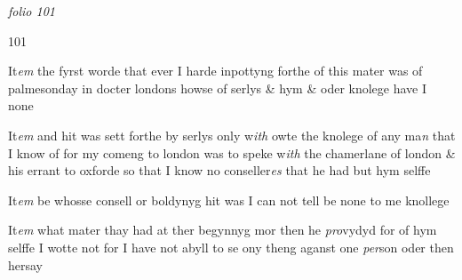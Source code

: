 \documentclass[12pt, a4paper]{book}
\begin{document}
\textit{folio 101}



\begin{flushright}{\color{Mahogany}101}\end{flushright}

            		
            			
				\marginpar[\vspace{0.5cm}{\textcolor{Gray}{1.}}]{}
			
            			
		\ifthenelse{\isodd{\thepage}}
		{\reversemarginpar}
		{\normalmarginpar}
		 It\textit{em} the fyrst worde that ever I harde inpottyng forthe of
 	this mater was of palmesonday in docter londons howse of
 serlys \& hym \& oder knolege have I none
            		
				\marginpar[\vspace{0.5cm}{\textcolor{Gray}{2.}}]{}
			
		\ifthenelse{\isodd{\thepage}}
		{\reversemarginpar}
		{\normalmarginpar}
		 It\textit{em} and hit was sett forthe by serlys only w\textit{ith} owte the knolege
 of any ma\textit{n} that I know of for my comeng to london was
            			to speke w\textit{ith} the chamerlane of london \& his errant
            			to oxforde so that I know no conseller\textit{es} that he had but hym selffe
            		
            		
            			
				\marginpar[\vspace{0.5cm}{\textcolor{Gray}{3.}}]{}
			
            			
		\ifthenelse{\isodd{\thepage}}
		{\reversemarginpar}
		{\normalmarginpar}
		 It\textit{em} be whosse consell or boldynyg hit was I can not tell
 be none to me knollege
            		
            		
            			
				\marginpar[\vspace{0.5cm}{\textcolor{Gray}{4.}}]{}
			
            			
		\ifthenelse{\isodd{\thepage}}
		{\reversemarginpar}
		{\normalmarginpar}
		 It\textit{em} what mater thay had at ther begynnyg mor then he
 \textit{pro}vydyd for of hym selffe I wotte not for I have not abyll
 to se ony theng aganst one \textit{per}son oder then hersay
            		
            		
            			
				\marginpar[\vspace{0.5cm}{\textcolor{Gray}{5.}}]{}
			
\end{document}
